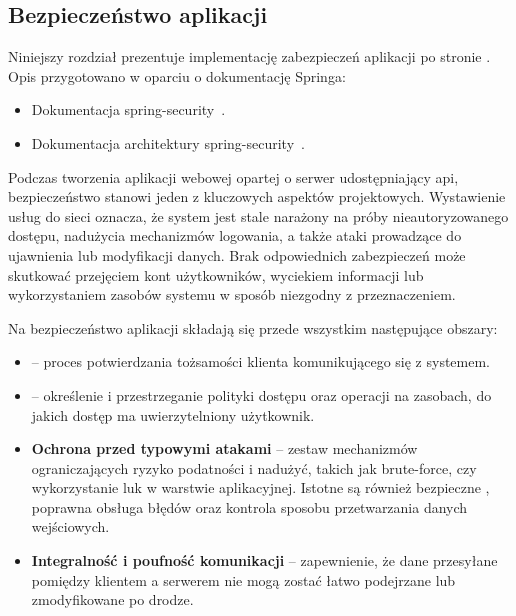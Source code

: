 
\subsection{Bezpieczeństwo aplikacji}
\label{subsec:bezpieczenstwo-aplikacji}

\newcommand{\innerheading}[1]{%
    \par\vspace{1.5\baselineskip}%
    \noindent\textbf{#1}\par\smallskip%
}

Niniejszy rozdział prezentuje implementację zabezpieczeń aplikacji po stronie .
Opis przygotowano w oparciu o dokumentację Springa:
\begin{itemize}
    \item Dokumentacja \gls{spring-security}~\cite{spring-security}.
    \item Dokumentacja architektury \gls{spring-security}~\cite{spring-security-architecture}.
\end{itemize}

Podczas tworzenia aplikacji webowej opartej o serwer udostępniający \gls{api},
bezpieczeństwo stanowi jeden z kluczowych aspektów projektowych.
Wystawienie usług do sieci oznacza, że system jest stale narażony na próby nieautoryzowanego dostępu,
nadużycia mechanizmów logowania, a także ataki prowadzące do ujawnienia lub modyfikacji danych.
Brak odpowiednich zabezpieczeń może skutkować przejęciem kont użytkowników, wyciekiem informacji
lub wykorzystaniem zasobów systemu w sposób niezgodny z przeznaczeniem.

Na bezpieczeństwo aplikacji składają się przede wszystkim następujące obszary:
\begin{itemize}
    \item \textbf{} -- proces potwierdzania tożsamości klienta komunikującego się z systemem.
    \item \textbf{} -- określenie i przestrzeganie polityki dostępu oraz operacji na zasobach,
    do jakich dostęp ma uwierzytelniony użytkownik.
    \item \textbf{Ochrona przed typowymi atakami} -- zestaw mechanizmów ograniczających ryzyko podatności i nadużyć,
    takich jak brute-force, czy wykorzystanie luk w warstwie aplikacyjnej.
    Istotne są również bezpieczne  , poprawna obsługa błędów oraz kontrola sposobu przetwarzania danych wejściowych.
    \item \textbf{Integralność i poufność komunikacji} -- zapewnienie, że dane przesyłane pomiędzy klientem a serwerem
    nie mogą zostać łatwo podejrzane lub zmodyfikowane po drodze.
\end{itemize}

